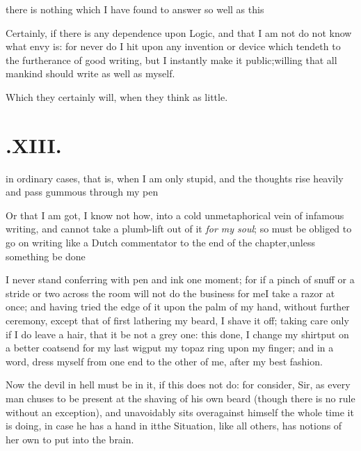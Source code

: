 \documentclass{article}
\begin{document}
\noindent
{}
there is nothing which I
have found to answer so well as this\tsh

\etpp
\tsh Certainly, if there is any depend\-ence upon Logic, and that I am not
do not know what envy is: for never do I hit upon any invention or
device which tendeth to the furtherance of good writing, but I instantly make it
public;\break willing that all mankind should write as well as myself.

\tsh Which they certainly will, when they think as little.

\vfill{}\eject
\null{}\baselineskip
\section{.\enspace XIII.}

 in ordinary cases, that is, when
I am only stupid, and the thoughts rise heavily and pass gummous
through my pen\tsh

Or that I am got, I know not how, into a cold unmetaphorical vein of infamous
writing, and cannot take a plumb-lift out of it \textit{for my soul}; so must be
obliged to go on writing like a Dutch commentator to the end of
the chapter,\break unless
something be done\tsh

\tsh I never stand conferring with pen and ink one moment; for if a pinch of snuff
or a stride or two across the room will not do the business for me\tsk I take a razor
at once; and having tried the edge\etp{} of it upon the palm of my hand, without
further ceremony, except that of first lathering my beard, I shave it off; taking
care only if I do leave a hair, that it be not a grey one: this done, I change my
shirt\tsk put on a better coat\tsk send for my last wig\tsk put my topaz ring upon my
finger; and in a word, dress myself from one end to the other of me, after my best
fashion.

Now the devil in hell must be in it, if this does not do: for consider, Sir, as
every man chuses to be present at the shaving of his own beard (though there is no
rule without an exception), and unavoidably sits overagainst himself the whole time
it is doing, in case he has a hand in it\tsk the Situation, like all others, has
notions of her own to put into the brain.\tsh
\end{document}
